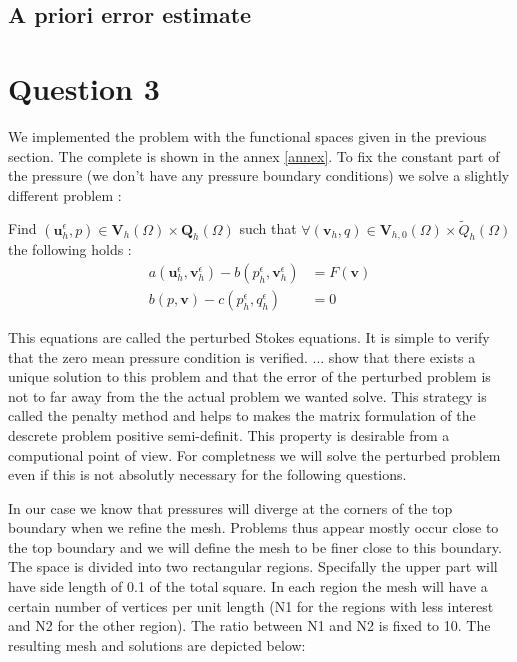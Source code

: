 \documentclass{article}
\begin{document}
\subsection*{A priori error estimate}

\section*{Question 3}
We implemented the problem with the functional spaces given in the previous
section. The complete is shown in the annex \ref{annex}. To fix the
constant part of the pressure (we don't have any pressure boundary conditions)
we solve a slightly different problem :

Find $(\mathbf{u}^\epsilon_h,p)\in \mathbf{V}_h(\Omega) \times \mathbf{Q}_h(\Omega)$ such that
$\forall (\mathbf{v}_h,q)\in \mathbf{V}_{h,0}(\Omega) \times \tilde{Q}_h(\Omega)$ the
following holds :
\begin{align}
	\label{abstract_form_dis}
	a(\mathbf{u}^\epsilon_h,\mathbf{v}^\epsilon_h) -
	b(p^\epsilon_h,\mathbf{v}^\epsilon_h) &= F(\mathbf{v}) \\ b(p,\mathbf{v}) -
	c(p^\epsilon_h,q^\epsilon_h) &= 0 \nonumber
\end{align}

This equations are called the perturbed Stokes equations. It is simple to
verify that the zero mean pressure condition is verified. ... show that there
exists a unique solution to this problem and that the error of the perturbed
problem is not to far away from the the actual problem we wanted solve. This
strategy is called the penalty method and helps to makes the matrix formulation
of the descrete problem positive semi-definit. This property is desirable from
a computional point of view. For completness we will solve the perturbed
problem even if this is not absolutly necessary for the following questions.

In our case we know that pressures will diverge at the corners of the top
boundary when we refine the mesh. Problems thus appear mostly occur close to
the top boundary and we will define the mesh to be finer close to this
boundary. The space is divided into two rectangular regions. Specifally the
upper part will have side length of 0.1 of the total square. In each region the
mesh will have a certain number of vertices per unit length (N1 for the regions
with less interest and N2 for the other region). The ratio between N1 and N2 is
fixed to 10. The resulting mesh and solutions are depicted below:
\end{document}
